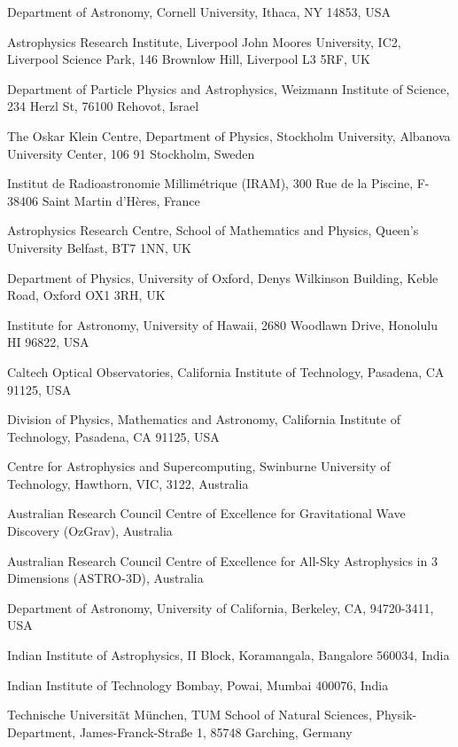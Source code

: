 \documentclass{nature_plusfigure}
\begin{document}
\begin{small}
\begin{affiliations}
\label{sec:affiliations}

\item Department of Astronomy, Cornell University, Ithaca, NY 14853, USA
\item Astrophysics Research Institute, Liverpool John Moores University, IC2, Liverpool Science Park, 146 Brownlow Hill, Liverpool L3 5RF, UK
\item Department of Particle Physics and Astrophysics, Weizmann Institute of Science, 234 Herzl St, 76100 Rehovot, Israel
\item The Oskar Klein Centre, Department of Physics, Stockholm University, Albanova University Center, 106 91 Stockholm, Sweden
\item Institut de Radioastronomie Millimétrique (IRAM), 300 Rue de la Piscine, F-38406 Saint Martin d’Hères, France
\item Astrophysics Research Centre, School of Mathematics and Physics, Queen's University Belfast, BT7 1NN, UK
\item Department of Physics, University of Oxford, Denys Wilkinson Building, Keble Road, Oxford OX1 3RH, UK
\item Institute for Astronomy, University of Hawaii, 2680 Woodlawn Drive, Honolulu HI 96822, USA
\item Caltech Optical Observatories, California Institute of Technology, Pasadena, CA 91125, USA
\item Division of Physics, Mathematics and Astronomy, California Institute of Technology, Pasadena, CA 91125, USA
\item Centre for Astrophysics and Supercomputing, Swinburne University of Technology, Hawthorn, VIC, 3122, Australia
\item Australian Research Council Centre of Excellence for Gravitational Wave Discovery (OzGrav), Australia
\item Australian Research Council Centre of Excellence for All-Sky Astrophysics in 3 Dimensions (ASTRO-3D), Australia
\item Department of Astronomy, University of California, Berkeley, CA, 94720-3411, USA 
\item Indian Institute of Astrophysics, II Block, Koramangala, Bangalore 560034, India
\item Indian Institute of Technology Bombay, Powai, Mumbai 400076, India
\item Technische Universit{\"a}t M{\"u}nchen, TUM School of Natural Sciences, Physik-Department, James-Franck-Stra{\ss}e 1, 85748 Garching, Germany

\end{affiliations}
\end{small}
\end{document}
